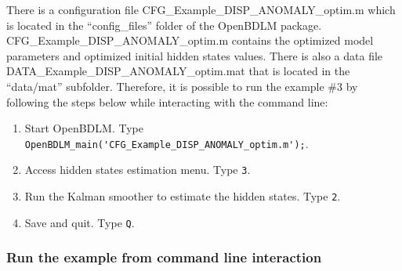 There is a configuration file CFG\_Example\_DISP\_ANOMALY\_optim.m which is located in the ``config\_files'' folder of the OpenBDLM package.
CFG\_Example\_DISP\_ANOMALY\_optim.m contains the optimized model parameters and optimized initial hidden states values.
There is also a data file DATA\_Example\_DISP\_ANOMALY\_optim.mat that is located in the ``data/mat'' subfolder.
Therefore, it is possible to run the example \#3 by following the steps below while interacting with the \MATLAB{} command line:
\begin{enumerate}
\item Start OpenBDLM. Type \colorbox{light-gray}{\lstinline[basicstyle = \mlttfamily \small, backgroundcolor = \color{light-gray}]!OpenBDLM_main('CFG_Example_DISP_ANOMALY_optim.m');!}.
\item Access hidden states estimation menu. Type \colorbox{light-gray}{\lstinline[basicstyle = \mlttfamily \small, backgroundcolor = \color{light-gray}]!3!}.
\item Run the Kalman smoother to estimate the hidden states. Type \colorbox{light-gray}{\lstinline[basicstyle = \mlttfamily \small, backgroundcolor = \color{light-gray}]!2!}.
\item Save and quit. Type \colorbox{light-gray}{\lstinline[basicstyle = \mlttfamily \small, backgroundcolor = \color{light-gray}]!Q!}.
\end{enumerate}


\subsubsection{Run the example from command line interaction}

